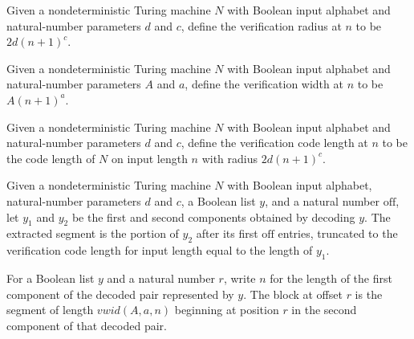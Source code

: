 \begin{definition}
\label{Complexity.TQBFHard.vrad}
\leanok
Given a nondeterministic Turing machine $N$ with Boolean input alphabet and
natural-number parameters $d$ and $c$, define the verification radius at $n$ to be
$2d(n+1)^c$.
\end{definition}

\begin{definition}
\label{Complexity.TQBFHard.vwid}
\leanok
Given a nondeterministic Turing machine $N$ with Boolean input alphabet and
natural-number parameters $A$ and $a$, define the verification width at $n$ to be
$A(n+1)^a$.
\end{definition}

\begin{definition}
\label{Complexity.TQBFHard.vlen}
\leanok
{}
Given a nondeterministic Turing machine $N$ with Boolean input alphabet and
natural-number parameters $d$ and $c$, define the verification code length at $n$ to be
the code length of $N$ on input length $n$ with radius $2d(n+1)^c$.
\end{definition}

\begin{definition}
\label{Complexity.TQBFHard.cpAt}
\leanok
{}
Given a nondeterministic Turing machine $N$ with Boolean input alphabet, natural-number
parameters $d$ and $c$, a Boolean list $y$, and a natural number $\mathrm{off}$, let
$y_1$ and $y_2$ be the first and second components obtained by decoding $y$. The
extracted segment is the portion of $y_2$ after its first $\mathrm{off}$ entries,
truncated to the verification code length for input length equal to the length of $y_1$.
\end{definition}

\begin{definition}
\label{Complexity.TQBFHard.blkAt}
\leanok
{}
For a Boolean list $y$ and a natural number $r$, write $n$ for the length of the first
component of the decoded pair represented by $y$. The block at offset $r$ is the segment
of length $vwid(A,a,n)$ beginning at position $r$ in the second component of that
decoded pair.
\end{definition}


